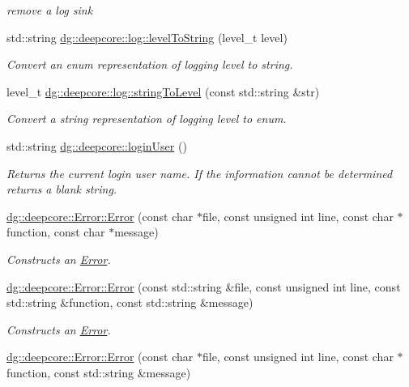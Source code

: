 \begin{DoxyCompactItemize}
\begin{DoxyCompactList}\small\item\em remove a log sink \end{DoxyCompactList}\item 
std\+::string \hyperlink{group___utility_module_ga16b3e354d4c2a3894e9fa0354103e7b3}{dg\+::deepcore\+::log\+::level\+To\+String} (level\+\_\+t level)
\begin{DoxyCompactList}\small\item\em Convert an enum representation of logging level to string. \end{DoxyCompactList}\item 
level\+\_\+t \hyperlink{group___utility_module_gafb8296927e835cd0399664adc12a5be8}{dg\+::deepcore\+::log\+::string\+To\+Level} (const std\+::string \&str)
\begin{DoxyCompactList}\small\item\em Convert a string representation of logging level to enum. \end{DoxyCompactList}\item 
std\+::string \hyperlink{group___utility_module_ga7eb961cce72452d6bc60ca27f699bad6}{dg\+::deepcore\+::login\+User} ()
\begin{DoxyCompactList}\small\item\em Returns the current login user name. If the information cannot be determined returns a blank string. \end{DoxyCompactList}\item 
\hyperlink{group___utility_module_ga345a7202460cb865e17cff4a78c7bcf6}{dg\+::deepcore\+::\+Error\+::\+Error} (const char $\ast$file, const unsigned int line, const char $\ast$function, const char $\ast$message)
\begin{DoxyCompactList}\small\item\em Constructs an \hyperlink{classdg_1_1deepcore_1_1_error}{Error}. \end{DoxyCompactList}\item 
\hyperlink{group___utility_module_ga0e8a3ee91298ab22afb0d7146afa23fb}{dg\+::deepcore\+::\+Error\+::\+Error} (const std\+::string \&file, const unsigned int line, const std\+::string \&function, const std\+::string \&message)
\begin{DoxyCompactList}\small\item\em Constructs an \hyperlink{classdg_1_1deepcore_1_1_error}{Error}. \end{DoxyCompactList}\item 
\hyperlink{group___utility_module_gab98e5ffafca5efc6945f295698550854}{dg\+::deepcore\+::\+Error\+::\+Error} (const char $\ast$file, const unsigned int line, const char $\ast$function, const std\+::string \&message)

\end{DoxyCompactItemize}
